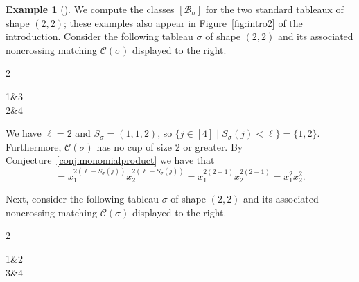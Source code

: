 \documentclass[11pt]{amsart}
\theoremstyle{remark}
\theoremstyle{remark}
\theoremstyle{definition}
\theoremstyle{definition}
\theoremstyle{definition}
\newtheorem{eg_no_qed}[theorem]{Example}
\newenvironment{ex}[1][]{\begin{eg_no_qed}[#1]\renewcommand{\qedsymbol}{$\Diamond$}\pushQED{\qed}}{\popQED\end{eg_no_qed}}
\numberwithin{equation}{section}
\newcommand{\gs}{\sigma}
\newcommand{\cb}{\mathcal{B}}
\newcommand{\cc}{\mathcal{C}}
\newcommand{\SF}{\mathcal{B}}
\newcommand{\cupsigma}{\cc(\gs)}
\begin{document}
\begin{ex}\label{ex.min4} We compute the classes $[\SF_\gs]$ for the two standard tableaux of shape $(2,2)$; these examples also appear in Figure~\ref{fig:intro2} of the introduction.  Consider the following tableau $\gs$ of shape $(2,2)$ and its associated noncrossing matching $\cupsigma$ displayed to the right.
\begin{multicols}{2}
   \begin{center}
      \begin{ytableau}
        1&3\\
        2&4
    \end{ytableau}
   \end{center} 
\vspace*{-.1in}
\end{multicols}
\noindent We have $\ell=2$ and  $S_\gs=(1,1,2)$, so $\{j\in[4]\mid S_\gs(j)<\ell\}=\{1,2\}$. Furthermore, $\cupsigma$ has no cup of size 2 or greater. By Conjecture~\ref{conj:monomialproduct} we have that
\begin{equation*}
[\cb_\gs]=x_1^{2(\ell-S_\gs(j))}  x_2^{2(\ell-S_\gs(j))} =x_1^{2(2-1)}  x_2^{2(2-1)} =x_1^2 x_2^2.
\end{equation*}


Next, consider the following tableau $\gs$ of shape $(2,2)$ and its associated noncrossing matching $\cupsigma$ displayed to the right.
\begin{multicols}{2}
   \begin{center}
      \begin{ytableau}
        1&2\\
        3&4
    \end{ytableau}
   \end{center} 
\vspace*{-.1in}
\end{multicols}
\end{ex}
\end{document}

